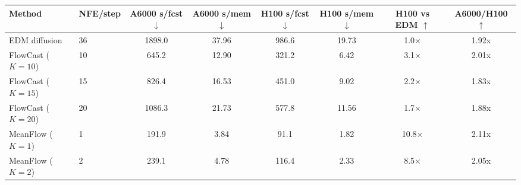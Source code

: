 \documentclass[border=10pt]{standalone}
\begin{document}
\begin{tabular}{llcccccc}
\toprule
Method & NFE/step & A6000 s/fcst $\downarrow$ & A6000 s/mem $\downarrow$ & H100 s/fcst $\downarrow$ & H100 s/mem $\downarrow$ & H100 vs EDM $\uparrow$ & A6000/H100 $\uparrow$ \\
\midrule
EDM diffusion & 36 & 1898.0 & 37.96 & 986.6 & 19.73 & 1.0$\times$ & 1.92x \\
FlowCast ($K{=}10$) & 10 & 645.2 & 12.90 & 321.2 & 6.42 & 3.1$\times$ & 2.01x \\
FlowCast ($K{=}15$) & 15 & 826.4 & 16.53 & 451.0 & 9.02 & 2.2$\times$ & 1.83x \\
FlowCast ($K{=}20$) & 20 & 1086.3 & 21.73 & 577.8 & 11.56 & 1.7$\times$ & 1.88x \\
MeanFlow ($K{=}1$) & 1 & 191.9 & 3.84 & 91.1 & 1.82 & 10.8$\times$ & 2.11x \\
MeanFlow ($K{=}2$) & 2 & 239.1 & 4.78 & 116.4 & 2.33 & 8.5$\times$ & 2.05x \\
\bottomrule
\end{tabular}
\end{document}
